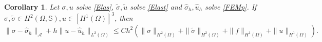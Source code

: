 \documentclass[12pt]{amsart}
\numberwithin{equation}{section}
\newtheorem{theorem}{Theorem}[section]
\newtheorem{corollary}[theorem]{Corollary}
\theoremstyle{definition}
\theoremstyle{remark}
\renewcommand{\(}{\bigl(}
\renewcommand{\)}{\bigr)}
\newcommand{\uu}{\hat{u}}  %
\newcommand{\ssigma}{\hat{\sigma}}   %
\newcommand{\tsigma}{\tilde{\sigma}}
\newcommand{\tu}{\tilde{u}}
\newcommand{\dive}{{\ensuremath\mathop{\mathrm{div}\,}}} %
\newcommand{\Aa}{\mathcal{A}}
\newcommand{\PPi}{J} %
\begin{document}

\begin{corollary}
Let $\sigma, u$ solve \eqref{Elas}, $\tsigma, \tu$ solve \eqref{Elast} and $\ssigma_h, \uu_h$ solve \eqref{FEMp}. If  $\sigma, \tsigma \in H^2(\Omega, \mathbb{S}), u \in [H^1(\Omega)]^3$, then
\[
\|\sigma-\ssigma_h\|_{\Aa}+ h \|u-\uu_h\|_{L^2(\Omega)} \le C  h^2 (\|\sigma\|_{H^2(\Omega)}+ \|\tsigma\|_{H^2(\Omega)}+ \|f\|_{H^1(\Omega)}+ \|u\|_{H^1(\Omega)}).
\]
 \end{corollary}
\end{document}
